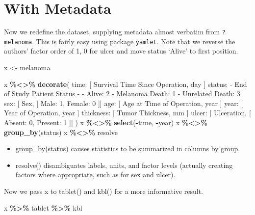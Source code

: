 \documentclass[
]{article}
\newenvironment{Shaded}{\begin{snugshade}}{\end{snugshade}}
\newcommand{\FunctionTok}[1]{\textcolor[rgb]{0.13,0.29,0.53}{\textbf{#1}}}
\newcommand{\NormalTok}[1]{#1}
\newcommand{\OtherTok}[1]{\textcolor[rgb]{0.56,0.35,0.01}{#1}}
\newcommand{\SpecialCharTok}[1]{\textcolor[rgb]{0.81,0.36,0.00}{\textbf{#1}}}
\newcommand{\StringTok}[1]{\textcolor[rgb]{0.31,0.60,0.02}{#1}}
\begin{document}
\section{With Metadata}\label{with-metadata}

Now we redefine the dataset, supplying metadata almost verbatim from
\texttt{?melanoma}. This is fairly easy using package \texttt{yamlet}.
Note that we reverse the authors' factor order of 1, 0 for ulcer and
move status `Alive' to first position.

\begin{Shaded}
\begin{Highlighting}[]
\NormalTok{x }\OtherTok{\textless{}{-}}\NormalTok{ melanoma}

\NormalTok{x }\SpecialCharTok{\%\textless{}\textgreater{}\%} \FunctionTok{decorate}\NormalTok{(}\StringTok{\textquotesingle{}}
\StringTok{time:      [ Survival Time Since Operation, day ]}
\StringTok{status:}
\StringTok{ {-} End of Study Patient Status}
\StringTok{ {-}}
\StringTok{  {-} Alive: 2}
\StringTok{  {-} Melanoma Death: 1}
\StringTok{  {-} Unrelated Death: 3}
\StringTok{sex:       [ Sex, [ Male: 1, Female: 0 ]]}
\StringTok{age:       [ Age at Time of Operation, year ]}
\StringTok{year:      [ Year of Operation, year ]}
\StringTok{thickness: [ Tumor Thickness, mm ]}
\StringTok{ulcer:     [ Ulceration, [ Absent: 0, Present: 1 ]]}
\StringTok{\textquotesingle{}}\NormalTok{)}
\NormalTok{x }\SpecialCharTok{\%\textless{}\textgreater{}\%} \FunctionTok{select}\NormalTok{(}\SpecialCharTok{{-}}\NormalTok{time, }\SpecialCharTok{{-}}\NormalTok{year)}
\NormalTok{x }\SpecialCharTok{\%\textless{}\textgreater{}\%} \FunctionTok{group\_by}\NormalTok{(status)}
\NormalTok{x }\SpecialCharTok{\%\textless{}\textgreater{}\%}\NormalTok{ resolve}
\end{Highlighting}
\end{Shaded}

\begin{itemize}
\item
  group\_by(status) causes statistics to be summarized in columns by
  group.
\item
  resolve() disambiguates labels, units, and factor levels (actually
  creating factors where appropriate, such as for sex and ulcer).
\end{itemize}

Now we pass x to tablet() and kbl() for a more informative result.

\begin{Shaded}
\begin{Highlighting}[]
\NormalTok{x }\SpecialCharTok{\%\textgreater{}\%}\NormalTok{ tablet }\SpecialCharTok{\%\textgreater{}\%}\NormalTok{ kbl}
\end{Highlighting}
\end{Shaded}
\end{document}
